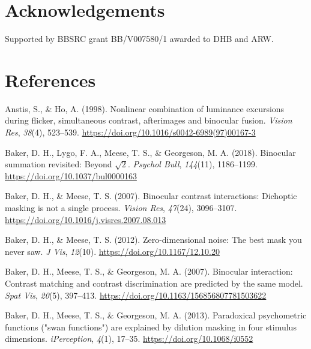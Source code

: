 \documentclass[
  letterpaper,
  DIV=11,
  numbers=noendperiod]{scrartcl}
\newlength{\cslhangindent}
\newlength{\cslentryspacingunit} %
\newenvironment{CSLReferences}[2] %
 {%
  \setlength{\parindent}{0pt}
  \ifodd #1
  \let\oldpar\par
  \def\par{\hangindent=\cslhangindent\oldpar}
  \fi
  \setlength{\parskip}{#2\cslentryspacingunit}
 }%
 {}
\begin{document}
\hypertarget{acknowledgements}{%
\section{Acknowledgements}\label{acknowledgements}}

Supported by BBSRC grant BB/V007580/1 awarded to DHB and ARW.

\hypertarget{references}{%
\section{References}\label{references}}

\hypertarget{refs}{}
\begin{CSLReferences}{1}{0}
\leavevmode{}%
Anstis, S., \& Ho, A. (1998). Nonlinear combination of luminance
excursions during flicker, simultaneous contrast, afterimages and
binocular fusion. \emph{Vision Res}, \emph{38}(4), 523--539.
\url{https://doi.org/10.1016/s0042-6989(97)00167-3}

\leavevmode{}%
Baker, D. H., Lygo, F. A., Meese, T. S., \& Georgeson, M. A. (2018).
Binocular summation revisited: Beyond \(\sqrt{2}\). \emph{Psychol Bull},
\emph{144}(11), 1186--1199. \url{https://doi.org/10.1037/bul0000163}

\leavevmode{}%
Baker, D. H., \& Meese, T. S. (2007). Binocular contrast interactions:
Dichoptic masking is not a single process. \emph{Vision Res},
\emph{47}(24), 3096--3107.
\url{https://doi.org/10.1016/j.visres.2007.08.013}

\leavevmode{}%
Baker, D. H., \& Meese, T. S. (2012). Zero-dimensional noise: The best
mask you never saw. \emph{J Vis}, \emph{12}(10).
\url{https://doi.org/10.1167/12.10.20}

\leavevmode{}%
Baker, D. H., Meese, T. S., \& Georgeson, M. A. (2007). Binocular
interaction: Contrast matching and contrast discrimination are predicted
by the same model. \emph{Spat Vis}, \emph{20}(5), 397--413.
\url{https://doi.org/10.1163/156856807781503622}

\leavevmode{}%
Baker, D. H., Meese, T. S., \& Georgeson, M. A. (2013). Paradoxical
psychometric functions ("swan functions") are explained by dilution
masking in four stimulus dimensions. \emph{{iPerception}}, \emph{4}(1),
17--35. \url{https://doi.org/10.1068/i0552}


\end{CSLReferences}
\end{document}
